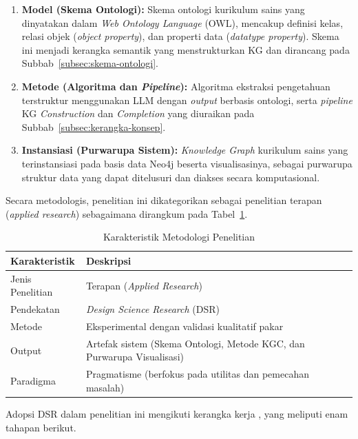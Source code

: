 \documentclass[../../thesis]{subfiles}
\begin{document}
\begin{enumerate}
  \item \textbf{Model (Skema Ontologi):} Skema ontologi kurikulum sains yang
        dinyatakan dalam \textit{Web Ontology Language} (OWL), mencakup definisi
        kelas, relasi objek (\textit{object property}), dan properti data
        (\textit{datatype property}). Skema ini menjadi kerangka semantik yang
        menstrukturkan KG dan dirancang pada Subbab~\ref{subsec:skema-ontologi}.
  \item \textbf{Metode (Algoritma dan \textit{Pipeline}):} Algoritma
        ekstraksi pengetahuan terstruktur menggunakan LLM dengan
        \textit{output} berbasis ontologi, serta \textit{pipeline} KG
        \textit{Construction} dan \textit{Completion} yang diuraikan pada
        Subbab~\ref{subsec:kerangka-konsep}.
  \item \textbf{Instansiasi (Purwarupa Sistem):} \textit{Knowledge Graph}
        kurikulum sains yang terinstansiasi pada basis data Neo4j beserta
        visualisasinya, sebagai purwarupa struktur data yang dapat ditelusuri
        dan diakses secara komputasional.
\end{enumerate}

Secara metodologis, penelitian ini dikategorikan sebagai penelitian
terapan (\textit{applied research}) sebagaimana dirangkum pada
Tabel~\ref{tab:karakteristik}.

\begin{table}[htbp]
\centering
\caption{Karakteristik Metodologi Penelitian}
\label{tab:karakteristik}
\begin{tabular}{@{}ll@{}}
  \toprule
  \textbf{Karakteristik} & \textbf{Deskripsi} \\
  \midrule
  Jenis Penelitian & Terapan (\textit{Applied Research}) \\
  Pendekatan       & \textit{Design Science Research} (DSR) \\
  Metode           & Eksperimental dengan validasi kualitatif pakar \\
  Output           & Artefak sistem (Skema Ontologi, Metode KGC, dan Purwarupa Visualisasi) \\
  Paradigma        & Pragmatisme (berfokus pada utilitas dan pemecahan masalah) \\
\end{tabular}
\end{table}

Adopsi DSR dalam penelitian ini mengikuti kerangka kerja
\textcite{peffers_design_2007}, yang meliputi enam tahapan berikut.
\end{document}
